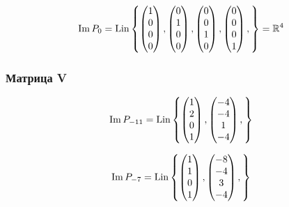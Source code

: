 \documentclass[12pt, a4paper]{article}
\begin{document}
    \begin{equation}
        \operatorname{Im} P_{0}  = \operatorname{Lin} \left\{ 
            \begin{pmatrix} 1 \\ 0 \\ 0 \\ 0 \end{pmatrix},
            \begin{pmatrix} 0 \\ 1 \\ 0 \\ 0 \end{pmatrix},
            \begin{pmatrix} 0 \\ 0 \\ 1 \\ 0 \end{pmatrix},
            \begin{pmatrix} 0 \\ 0 \\ 0 \\ 1 \end{pmatrix},
        \right\} = {\mathbb{R}}^4
    \end{equation}


    \subsubsection{Матрица V}

    \begin{equation}
        \operatorname{Im} P_{-11}  = \operatorname{Lin} \left\{ 
            \begin{pmatrix} 1 \\ 2 \\ 0 \\ 1 \end{pmatrix},
            \begin{pmatrix} -4 \\ -4 \\ 1 \\ -4 \end{pmatrix},
        \right\}
    \end{equation}

    \begin{equation}
        \operatorname{Im} P_{-7}  = \operatorname{Lin} \left\{ 
            \begin{pmatrix} 1 \\ 1 \\ 0 \\ 1 \end{pmatrix},
            \begin{pmatrix} -8 \\ -4 \\ 3 \\ -4 \end{pmatrix},
        \right\}
    \end{equation}
\end{document}
